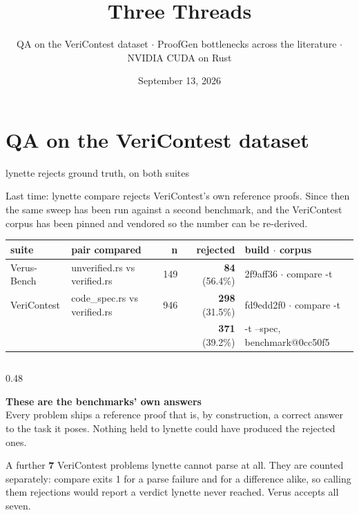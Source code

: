 \documentclass[aspectratio=169,10pt]{beamer}
\title{Three Threads}
\subtitle{QA on the VeriContest dataset $\cdot$ ProofGen bottlenecks across the literature $\cdot$ NVIDIA CUDA on Rust}
\date{September 13, 2026}
\institute{UIUC SRSE 2026 $\cdot$ Mahadi}
\newcommand{\code}[1]{{\ttfamily #1}}
\newcommand{\hd}[1]{\textbf{\color{lgTeal}#1}}
\newcommand{\bad}[1]{{\color{lgRed}#1}}
\begin{document}
\maketitle

\section{QA on the VeriContest dataset}

\begin{frame}{lynette rejects ground truth, on both suites}

{\scriptsize
Last time: \code{lynette compare} rejects VeriContest's own reference proofs. Since then the same
sweep has been run against a second benchmark, and the VeriContest corpus has been pinned and
vendored so the number can be re-derived.
}

\vspace{6pt}
\begin{center}
{\scriptsize
\begin{tabular}{llrrl}
\toprule
\textbf{suite} & \textbf{pair compared} & \textbf{n} & \textbf{rejected} & \textbf{build $\cdot$ corpus} \\
\midrule
Verus-Bench & \code{unverified.rs} vs \code{verified.rs}  & 149 & \bad{\textbf{84}} \ (56.4\%)
  & \code{2f9aff36} $\cdot$ \code{compare -t} \\
VeriContest & \code{code\_spec.rs} vs \code{verified.rs}  & 946 & \bad{\textbf{298}} \ (31.5\%)
  & \code{fd9edd2f0} $\cdot$ \code{compare -t} \\
            &                                             &     & \bad{\textbf{371}} \ (39.2\%)
  & \quad{} \code{-t --spec}, \code{benchmark@0cc50f5} \\
\bottomrule
\end{tabular}
}
\end{center}

\vspace{6pt}
\begin{columns}[T]
\begin{column}{0.48\textwidth}
{\scriptsize
\hd{These are the benchmarks' own answers}\\
Every problem ships a reference proof that is, by construction, a correct answer to the task it
poses. Nothing held to lynette could have produced the rejected ones.

\vspace{4pt}
{\color{lgGrey}A further \textbf{7} VeriContest problems lynette cannot parse at all. They are
counted separately: \code{compare} exits 1 for a parse failure and for a difference alike, so
calling them rejections would report a verdict lynette never reached. Verus accepts all seven.}
}
\end{column}


\end{columns}
\end{frame}
\end{document}
